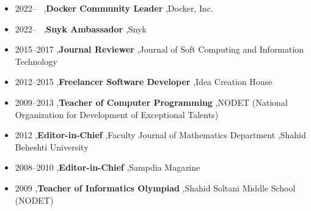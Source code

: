 
\nocite{*}

\printbibliography[heading=pubtype,title={\printinfo{\faBook}{Books}},type=book]


\printbibliography[heading=pubtype,title={\printinfo{\faFileTextO}{Research Reports}},type=misc]




\begin{itemize}
\item 2022--~ \sep \textbf{Docker Community Leader} \sep Docker, Inc.
\item 2022--~ \sep \textbf{Snyk Ambassador} \sep Snyk
\item 2015--2017 \sep \textbf{Journal Reviewer} \sep Journal of Soft Computing and Information Technology
\item 2012--2015 \sep \textbf{Freelancer Software Developer} \sep Idea Creation House
\item 2009--2013 \sep \textbf{Teacher of Computer Programming} \sep NODET (National Organization for Development of Exceptional Talents)
\item 2012 \sep \textbf{Editor-in-Chief} \sep Faculty Journal of Mathematics Department \sep Shahid Beheshti University
\item 2008--2010 \sep \textbf{Editor-in-Chief} \sep Sampdia Magazine
\item 2009 \sep \textbf{Teacher of Informatics Olympiad} \sep Shahid Soltani Middle School (NODET)
\end{itemize}


